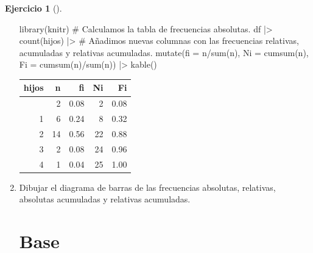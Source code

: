 \documentclass[
  spanish,
  a4paper,
]{scrreport}
\newenvironment{Shaded}{\begin{snugshade}}{\end{snugshade}}
\newcommand{\AttributeTok}[1]{\textcolor[rgb]{0.40,0.45,0.13}{#1}}
\newcommand{\CommentTok}[1]{\textcolor[rgb]{0.37,0.37,0.37}{#1}}
\newcommand{\FunctionTok}[1]{\textcolor[rgb]{0.28,0.35,0.67}{#1}}
\newcommand{\NormalTok}[1]{\textcolor[rgb]{0.00,0.23,0.31}{#1}}
\newcommand{\SpecialCharTok}[1]{\textcolor[rgb]{0.37,0.37,0.37}{#1}}
\theoremstyle{definition}
\newtheorem{exercise}{Ejercicio}[chapter]
\theoremstyle{remark}
\begin{document}
\begin{exercise}[]
\begin{enumerate}
\begin{tcolorbox}
\begin{Shaded}
\begin{Highlighting}[]
\FunctionTok{library}\NormalTok{(knitr)}
\CommentTok{\# Calculamos la tabla de frecuencias absolutas.}
\NormalTok{df }\SpecialCharTok{|\textgreater{}} \FunctionTok{count}\NormalTok{(hijos) }\SpecialCharTok{|\textgreater{}}
    \CommentTok{\# Añadimos nuevas columnas con las frecuencias relativas, acumuladas y relativas acumuladas.}
    \FunctionTok{mutate}\NormalTok{(}\AttributeTok{fi =}\NormalTok{ n}\SpecialCharTok{/}\FunctionTok{sum}\NormalTok{(n), }\AttributeTok{Ni =} \FunctionTok{cumsum}\NormalTok{(n), }\AttributeTok{Fi =} \FunctionTok{cumsum}\NormalTok{(n)}\SpecialCharTok{/}\FunctionTok{sum}\NormalTok{(n)) }\SpecialCharTok{|\textgreater{}}
    \FunctionTok{kable}\NormalTok{()}
\end{Highlighting}
\end{Shaded}

  \begin{longtable}[]{@{}rrrrr@{}}
  \toprule\noalign{}
  hijos & n & fi & Ni & Fi \\
  \midrule\noalign{}
  \endhead
  \bottomrule\noalign{}
  \endlastfoot
  0 & 2 & 0.08 & 2 & 0.08 \\
  1 & 6 & 0.24 & 8 & 0.32 \\
  2 & 14 & 0.56 & 22 & 0.88 \\
  3 & 2 & 0.08 & 24 & 0.96 \\
  4 & 1 & 0.04 & 25 & 1.00 \\
  \end{longtable}

  \end{tcolorbox}
\item
  Dibujar el diagrama de barras de las frecuencias absolutas, relativas,
  absolutas acumuladas y relativas acumuladas.

  \begin{tcolorbox}[enhanced jigsaw, colback=white, coltitle=black, toprule=.15mm, rightrule=.15mm, opacitybacktitle=0.6, opacityback=0, bottomtitle=1mm, toptitle=1mm, titlerule=0mm, breakable, leftrule=.75mm, title=\textcolor{quarto-callout-tip-color}{\faLightbulb}\hspace{0.5em}{Solución}, arc=.35mm, left=2mm, bottomrule=.15mm, colframe=quarto-callout-tip-color-frame, colbacktitle=quarto-callout-tip-color!10!white]

  \section{Base}


\end{tcolorbox}
\end{enumerate}
\end{exercise}
\end{document}
